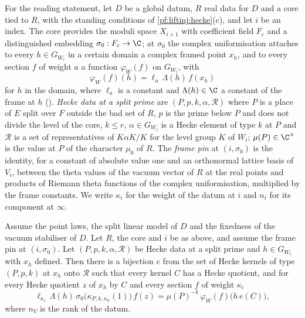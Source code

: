 For the reading statement, let $D$ be a global datum, $R$ real data for $D$ and a core tied to $R$, with the standing conditions of
\cref{pf:liftinj:hecke}(c), and let $i$ be an index. The core provides the moduli space $X_{i+1}$ with coefficient field $F_c$ and a distinguished
embedding $\sigma_0:F_c\to\C$; at $\sigma_0$ the complex uniformisation attaches to every $h\in G_{W_i}$ in a certain domain a complex framed point
$x_h$, and to every section $f$ of weight $a$ a function $\varphi_W(f)$ on $G_{W_i}$, with
\begin{equation}\label{eq:pf:liftinj:phiW}
\varphi_W(f)(h)=\ell_a\,\Lambda(h)\,f(x_h)
\end{equation}
for $h$ in the domain, where $\ell_a$ is a constant and $\Lambda(h)\in\C$ a constant of the frame at $h$
(). \emph{Hecke data at a split prime} are $(P,p,k,\alpha,\mathcal R)$ where $P$ is a place of $E$ split
over $F$ outside the bad set of $R$, $p$ is the prime below $P$ and does not divide the level of the core, $k\le r$, $\alpha\in G_{W_i}$ is a Hecke
element of type $k$ at $P$ and $\mathcal R$ is a set of representatives of $K\alpha K/K$ for the level group $K$ of $W_i$; $\mu(P)\in\C^\times$ is the value at
$P$ of the character $\mu_0$ of $R$. The \emph{frame pin} at $(i,\sigma_0)$ is the identity, for a constant of absolute value one and an orthonormal
lattice basis of $V_i$, between the theta values of the vacuum vector of $R$ at the real points and products of Riemann theta functions of the complex
uniformisation, multiplied by the frame constants. We write $\kappa_i$ for the weight of the datum at $i$ and $n_i$ for its component at $\infty$.

\begin{proposition}\label{pf:liftinj:hker}
Assume the point laws, the split linear model of $D$ and the fixedness of the vacuum stabiliser of $D$. Let $R$, the core and $i$ be as above, and
assume the frame pin at $(i,\sigma_0)$. Let $(P,p,k,\alpha,\mathcal R)$ be Hecke data at a split prime and $h\in G_{W_i}$ with $x_h$ defined. Then there is
a bijection $e$ from the set of Hecke kernels of type $(P,p,k)$ at $x_h$ onto $\mathcal R$ such that every kernel $C$ has a Hecke quotient, and for every
Hecke quotient $z$ of $x_h$ by $C$ and every section $f$ of weight $\kappa_i$
\[
\ell_{\kappa_i}\,\Lambda(h)\,\sigma_0\bigl(\kappa_{P,k,n_V}(1)\bigr)\,f(z)=\mu(P)^{-k}\,\varphi_W(f)\bigl(h\,e(C)\bigr),
\]
where $n_V$ is the rank of the datum.
\end{proposition}


